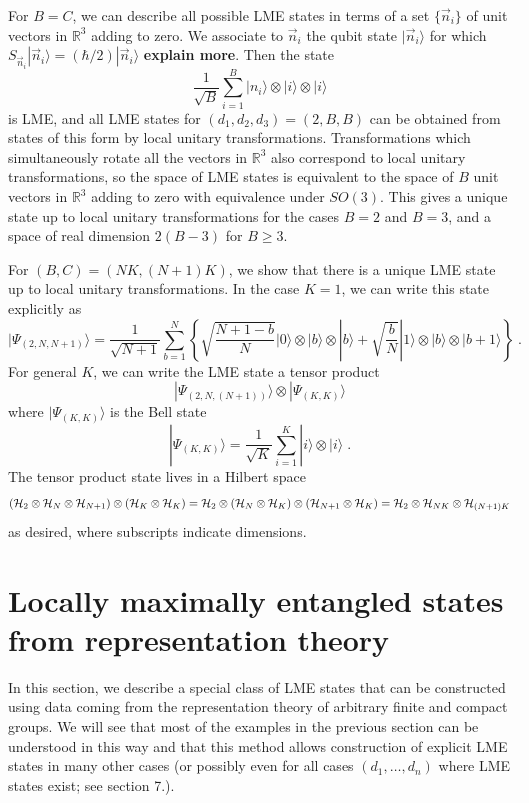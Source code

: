 \documentclass[12pt]{article}
\theoremstyle{definition}
\newcommand{\be}{\begin{equation}}
\newcommand{\ee}{\end{equation}}
\begin{document}
For $B=C$, we can describe all possible LME states in terms of a set
$\{\vec{n}_i \}$ of unit vectors in $\mathbb{R}^3$ adding to zero. We
associate to $\vec{n}_i$ the qubit state $|\vec{n}_i \rangle$ for
which $S_{\vec{n}_i} |\vec{n}_i \rangle = (\hbar/2)|\vec{n}_i \rangle$
{\bf explain more}. Then the state 
\be \frac{1}{\sqrt{B}} \sum_{i=1}^B
|n_{i} \rangle \otimes |i \rangle \otimes |i \rangle \ee 
is LME, and
all LME states for $(d_1,d_2,d_3) = (2,B,B)$ can be obtained from
states of this form by local unitary transformations. Transformations
which simultaneously rotate all the vectors in $\mathbb{R}^3$ also
correspond to local unitary transformations, so the space of LME
states is equivalent to the space of $B$ unit vectors in
$\mathbb{R}^3$ adding to zero with equivalence under $SO(3)$. This
gives a unique state up to local unitary transformations for the cases
$B=2$ and $B=3$, and a space of real dimension $2(B-3)$ for $B \ge 3$.

For $(B,C)=(NK,(N+1)K)$, we show that there is a unique LME state up to local unitary transformations. In the case $K=1$, we can write this state explicitly as
\be
|\Psi_{(2,N,N+1)} \rangle = \frac{1}{\sqrt{N+1}} \sum_{b=1}^N \left\{ \sqrt{\frac{N + 1 - b}{N}} |0 \rangle \otimes  |b  \rangle \otimes |b \rangle + \sqrt{\frac{b}{N}}  |1 \rangle \otimes|b \rangle \otimes |b+1 \rangle \right\} \; .
\ee
For general $K$, we can write the LME state a tensor product
\be
|\Psi_{(2,N,(N+1))} \rangle \otimes |\Psi_{(K,K)} \rangle
\ee
where $|\Psi_{(K,K)} \rangle$ is the Bell state
\be
|\Psi_{(K,K)} \rangle = \frac{1}{\sqrt{K}}  \sum_{i=1}^K  |i \rangle \otimes  |i \rangle \; .
\ee
The tensor product state lives in a Hilbert space
\be
({\cal H}_2 \otimes {\cal H}_N \otimes {\cal H}_{N+1}) \otimes ({\cal H}_K \otimes {\cal H}_K) = {\cal H}_2 \otimes ({\cal H}_N \otimes {\cal H}_K) \otimes ({\cal H}_{N+1} \otimes {\cal H}_K) = {\cal H}_2 \otimes {\cal H}_{NK} \otimes {\cal H}_{(N+1)K}
\ee
as desired, where subscripts indicate dimensions.

\section{Locally maximally entangled states from representation theory}

In this section, we describe a special class of LME states that can be constructed using data coming from the representation theory of arbitrary finite and compact groups. We will see that most of the examples in the previous section can be understood in this way and that this method allows construction of explicit LME states in many other cases (or possibly even for all cases $(d_1, \dots, d_n)$ where LME states exist; see section 7.).
\end{document}
